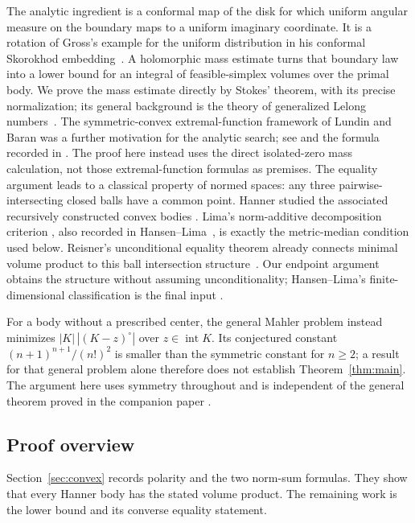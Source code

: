 The analytic ingredient is a conformal map of the disk for which
uniform angular measure on the boundary maps to a uniform imaginary
coordinate. It is a rotation of
Gross's example for the uniform distribution in his conformal Skorokhod
embedding~\cite[Section~3.2]{Gross}. A holomorphic mass estimate turns
that boundary law into a lower bound for an integral of feasible-simplex
volumes over the primal body. We prove the mass estimate directly by
Stokes' theorem, with its precise normalization; its general background
is the theory of generalized Lelong numbers~\cite[Sections~3 and~5]{Demailly}.
The symmetric-convex extremal-function framework of Lundin and Baran
was a further motivation for the analytic search; see
\cite{Lundin1985} and the formula recorded in
\cite[Proposition~1.2, pp.~246--247]{BosCalviLevenberg2001}.
The proof here instead uses the direct isolated-zero mass calculation,
not those extremal-function formulas as premises.
The equality argument leads to a classical property of normed spaces:
any three pairwise-intersecting closed balls have a common point.
Hanner studied the associated recursively constructed convex bodies
\cite{Hanner1956}. Lima's norm-additive decomposition criterion
\cite[Theorem~1.2]{Lima1978}, also recorded in
Hansen--Lima~\cite[Theorem~3.6(4)]{HansenLima1981}, is exactly the
metric-median condition used below. Reisner's unconditional equality
theorem already connects minimal volume product to this ball
intersection structure~\cite[Theorem~1]{Reisner1987}. Our endpoint
argument obtains the structure without assuming unconditionality;
Hansen--Lima's finite-dimensional classification is the final input
\cite[Corollary~7.4]{HansenLima1981}.

For a body without a prescribed center, the general Mahler problem
instead minimizes $|K|\,|(K-z)^\circ|$ over $z\in\operatorname{int}K$.
Its conjectured constant $(n+1)^{n+1}/(n!)^2$ is smaller than the
symmetric constant for $n\ge2$; a result for that general problem alone
therefore does not establish Theorem~\ref{thm:main}. The argument here
uses symmetry throughout and is independent of the general theorem
proved in the companion paper
\cite[Theorem~1.1]{OpenAIGeneralMahler2026}.

\subsection{Proof overview}

Section~\ref{sec:convex} records polarity and the two norm-sum formulas.
They show that every Hanner body has the stated volume product.
The remaining work is the lower bound and its converse equality
statement.

